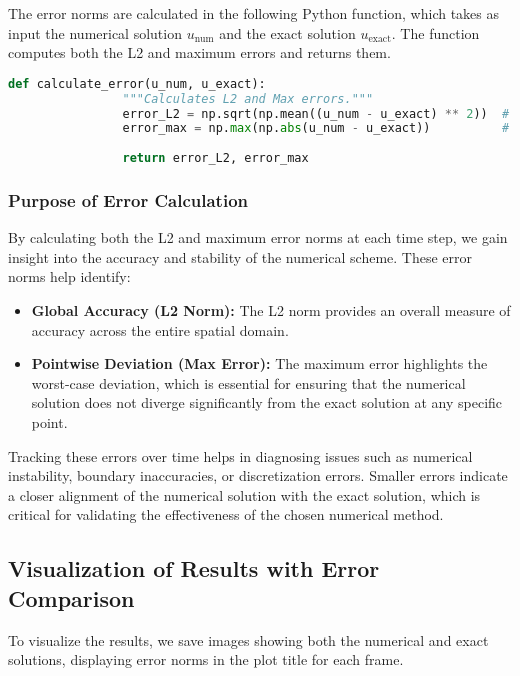 \documentclass{article}
\begin{document}
		 The error norms are calculated in the following Python function, which takes as input the numerical solution \( u_{\text{num}} \) and the exact solution \( u_{\text{exact}} \). The function computes both the L2 and maximum errors and returns them.
		 
		 \begin{lstlisting}[language=Python]
		 	def calculate_error(u_num, u_exact):
			 	"""Calculates L2 and Max errors."""
			 	error_L2 = np.sqrt(np.mean((u_num - u_exact) ** 2))  # L2 norm error
			 	error_max = np.max(np.abs(u_num - u_exact))          # Max error
			 	
			 	return error_L2, error_max
		 \end{lstlisting}
		 
		 \subsubsection{Purpose of Error Calculation}
		 
		 By calculating both the L2 and maximum error norms at each time step, we gain insight into the accuracy and stability of the numerical scheme. These error norms help identify:
		 \begin{itemize}
		 	\item \textbf{Global Accuracy (L2 Norm):} The L2 norm provides an overall measure of accuracy across the entire spatial domain.
		 	\item \textbf{Pointwise Deviation (Max Error):} The maximum error highlights the worst-case deviation, which is essential for ensuring that the numerical solution does not diverge significantly from the exact solution at any specific point.
		 \end{itemize}
		 Tracking these errors over time helps in diagnosing issues such as numerical instability, boundary inaccuracies, or discretization errors. Smaller errors indicate a closer alignment of the numerical solution with the exact solution, which is critical for validating the effectiveness of the chosen numerical method.
		 
		 
		 \subsection{Visualization of Results with Error Comparison}
		 
		 To visualize the results, we save images showing both the numerical and exact solutions, displaying error norms in the plot title for each frame.
		 
\end{document}
